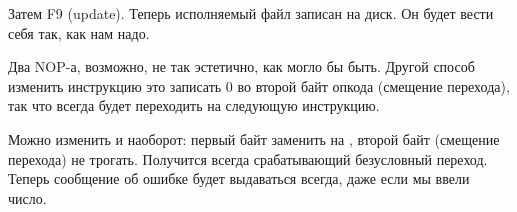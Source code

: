 Затем F9 (update). Теперь исполняемый файл записан на диск. Он будет вести себя так, как нам надо.

Два \ac{NOP}-а, возможно, не так эстетично, как могло бы быть.
Другой способ изменить инструкцию это записать 0 во второй байт опкода (смещение перехода),
так что  всегда будет переходить на следующую инструкцию.

Можно изменить и наоборот: первый байт заменить на , второй байт (смещение перехода) не трогать.
Получится всегда срабатывающий безусловный переход.
Теперь сообщение об ошибке будет выдаваться всегда, даже если мы ввели число.

